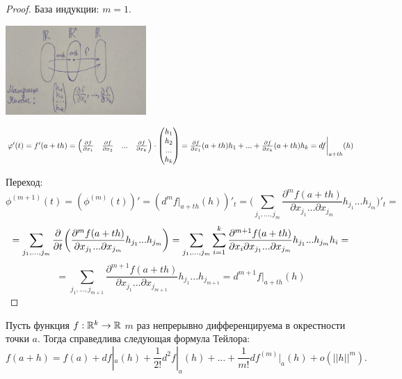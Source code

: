     \begin{proof}
    	База индукции: $m = 1$.
    	\begin{center}
    		\includegraphics[width=0.4\textwidth]{img/lecture39/matrix_yakobi}
    	\end{center}    	
    	$\varphi'(t) = f'(a + th) = \begin{pmatrix}
    		\frac{\partial f}{\partial x_1} & \frac{\partial f}{\partial x_2} & ... & \frac{\partial f}{\partial x_k}
    	\end{pmatrix} \cdot \begin{pmatrix}
    	h_1 \\
    	h_2 \\
    	... \\
    	h_k
    	\end{pmatrix} = \frac{\partial f}{\partial x_1}(a + th)h_1 + ... + \frac{\partial f}{\partial x_k}(a + th)h_k = df\bigg|_{a + th}(h)$
    	
    	Переход:
    	\[ \phi^{(m + 1)}(t) = (\phi^{(m)}(t))' = (d^mf|_{a + th}(h))'_t = \bigg(\sum_{j_1, ..., j_m} \frac{\partial^m f(a + th)}{\partial x_{j_1} ... \partial x_{j_m}} h_{j_1} ... h_{j_m}\bigg)'_t = \]
    	\[ = \sum_{j_1, ..., j_m} \frac{\partial }{\partial t} \bigg(\frac{\partial^m f(a + th)}{\partial x_{j_1} ... \partial x_{j_m}} h_{j_1} ... h_{j_m}\bigg) = \sum_{j_1, ..., j_m} \sum_{i = 1}^k \frac{\partial^{m + 1} f(a + th)}{\partial x_i \partial x_{j_1} ... \partial x_{j_m}} h_{j_1} ... h_{j_m} h_i = \]
    	\[ = \sum_{j_1, ..., j_{m + 1}} \frac{\partial^{m + 1} f(a + th)}{\partial x_{j_1} ... \partial x_{j_{m + 1}}} h_{j_1} ... h_{j_{m + 1}} = d^{m + 1}f|_{a + th}(h) \]
    \end{proof}
    
    \begin{theorem}
    	Пусть функция $f: \mathbb R^k \rightarrow \mathbb R$ $m$ раз непрерывно дифференцируема в окрестности точки $a$. Тогда справедлива следующая формула Тейлора:
    	\[ f(a + h) = f(a) + df|_a(h) + \frac{1}{2!}d^2 f|_a(h) + ... + \frac{1}{m!}df^{(m)}|_a(h) + o(||h||^m). \]
    \end{theorem}
    

